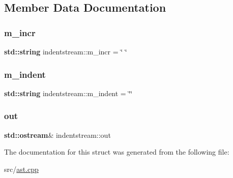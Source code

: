 \subsection{Member Data Documentation}
\mbox{\label{structindentstream_aefdc4c013e4c61c0c81b08f954dcafd8}} 
\subsubsection{\texorpdfstring{m\+\_\+incr}{m\_incr}}
{\footnotesize\ttfamily \textbf{ std\+::string} indentstream\+::m\+\_\+incr = \char`\"{} \char`\"{}}

\mbox{\label{structindentstream_a679f1453bdd2a44b50d75e08e92132bc}} 
\subsubsection{\texorpdfstring{m\+\_\+indent}{m\_indent}}
{\footnotesize\ttfamily \textbf{ std\+::string} indentstream\+::m\+\_\+indent = \char`\"{}\char`\"{}}

\mbox{\label{structindentstream_a17982da2855e0f5ef4f7b7408bd41883}} 
\subsubsection{\texorpdfstring{out}{out}}
{\footnotesize\ttfamily \textbf{ std\+::ostream}\& indentstream\+::out}



The documentation for this struct was generated from the following file\+:\begin{DoxyCompactItemize}
\item 
src/\hyperlink{ast_8cpp}{ast.\+cpp}\end{DoxyCompactItemize}
